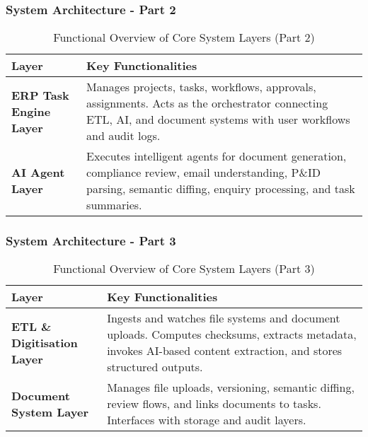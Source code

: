 \documentclass{beamer}
\begin{document}
\begin{frame}
  \frametitle{System Architecture - Part 2}
 \begin{table}[h!]
\centering
\renewcommand{\arraystretch}{1.2}
\begin{tabular}{|p{3cm}|p{7cm}|}
\hline
\textbf{Layer} & \textbf{Key Functionalities} \\
\hline

\textbf{ERP Task Engine Layer} & 
Manages projects, tasks, workflows, approvals, assignments. Acts as the orchestrator connecting ETL, AI, and document systems with user workflows and audit logs. \\
\hline

\textbf{AI Agent Layer} & 
Executes intelligent agents for document generation, compliance review, email understanding, P\&ID parsing, semantic diffing, enquiry processing, and task summaries. \\
\hline

\end{tabular}
\caption{Functional Overview of Core System Layers (Part 2)}
\end{table}
\end{frame}

\begin{frame}
  \frametitle{System Architecture - Part 3}
 \begin{table}[h!]
\centering
\renewcommand{\arraystretch}{1.2}
\begin{tabular}{|p{3cm}|p{7cm}|}
\hline
\textbf{Layer} & \textbf{Key Functionalities} \\
\hline

\textbf{ETL \& Digitisation Layer} & 
Ingests and watches file systems and document uploads. Computes checksums, extracts metadata, invokes AI-based content extraction, and stores structured outputs. \\
\hline

\textbf{Document System Layer} & 
Manages file uploads, versioning, semantic diffing, review flows, and links documents to tasks. Interfaces with storage and audit layers. \\
\hline

\end{tabular}
\caption{Functional Overview of Core System Layers (Part 3)}
\end{table}
\end{frame}
\end{document}
